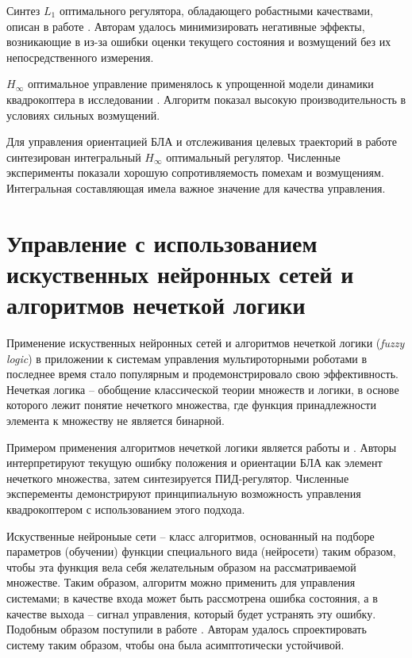 Синтез $L_1$ оптимального регулятора, обладающего робастными качествами, описан в работе \cite{Satici01}. Авторам удалось минимизировать негативные эффекты, возникающие в из-за ошибки оценки текущего состояния и возмущений без их непосредственного измерения.

$H_{\infty}$ оптимальное управление применялось к упрощенной модели динамики квадрокоптера в исследовании \cite{Falkenberg01}. Алгоритм показал высокую производительность в условиях сильных возмущений.

Для управления ориентацией БЛА и отслеживания целевых траекторий в работе \cite{Raffo01} синтезирован интегральный $H_{\infty}$ оптимальный регулятор. Численные эксперименты показали хорошую сопротивляемость помехам и возмущениям. Интегральная составляющая имела важное значение для качества управления.

\section{Управление с использованием искуственных нейронных сетей и алгоритмов нечеткой логики}

Применение искуственных нейронных сетей и алгоритмов нечеткой логики (\textit{fuzzy logic}) в приложении к системам управления мультироторными роботами в последнее время стало популярным и продемонстрировало свою эффективность. Нечеткая логика  -- обобщение классической теории множеств и логики, в основе которого лежит понятие нечеткого множества, где функция принадлежности элемента к множеству не является бинарной.

Примером применения алгоритмов нечеткой логики является работы \cite{Dierks01} и \cite{Santos01}. Авторы интерпретируют текущую ошибку положения и ориентации БЛА как элемент нечеткого множества, затем синтезируется ПИД-регулятор. Численные эксперементы демонстрируют принципиальную возможность управления квадрокоптером с использованием этого подхода.

Искуственные нейроныые сети -- класс алгоритмов, основанный на подборе параметров (обучении) функции специального вида (нейросети) таким образом, чтобы эта функция вела себя желательным образом на рассматриваемой множестве. Таким образом, алгоритм можно применить для управления системами; в качестве входа может быть рассмотрена ошибка состояния, а в качестве выхода -- сигнал управления, который будет устранять эту ошибку. Подобным образом поступили в работе \cite{Nicol01}. Авторам удалось спроектировать систему таким образом, чтобы она была асимптотически устойчивой.

